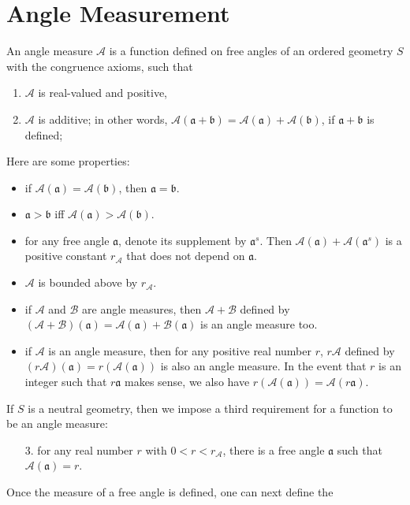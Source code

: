 \documentclass[12pt]{article}
\begin{document}
\section{Angle Measurement}
An angle measure $\mathcal{A}$ is a function defined on free angles
of an ordered geometry $S$ with the congruence axioms, such that
\begin{enumerate}
\item $\mathcal{A}$ is real-valued and positive,
\item $\mathcal{A}$ is additive; in other words,
$\mathcal{A}(\mathfrak{a}+\mathfrak{b})=
\mathcal{A}(\mathfrak{a})+\mathcal{A}(\mathfrak{b})$, if
$\mathfrak{a}+\mathfrak{b}$ is defined;
\end{enumerate}
Here are some properties:
\begin{itemize}
\item if $\mathcal{A}(\mathfrak{a})=\mathcal{A}(\mathfrak{b})$, then
$\mathfrak{a}=\mathfrak{b}$.
\item $\mathfrak{a}>\mathfrak{b}$ iff $\mathcal{A}(\mathfrak{a})>
\mathcal{A}(\mathfrak{b})$.
\item for any free angle $\mathfrak{a}$, denote its supplement by
$\mathfrak{a}^s$.  Then $\mathcal{A}(\mathfrak{a})+
\mathcal{A}(\mathfrak{a}^s)$ is a positive constant
$r_{\mathcal{A}}$ that does not depend on $\mathfrak{a}$.
\item $\mathcal{A}$ is bounded above by $r_{\mathcal{A}}$.
\item if $\mathcal{A}$ and $\mathcal{B}$ are angle measures, then
$\mathcal{A+B}$ defined by $(\mathcal{A+B})(\mathfrak{a})=
\mathcal{A}(\mathfrak{a})+\mathcal{B}(\mathfrak{a})$ is an angle
measure too.
\item if $\mathcal{A}$ is an angle measure, then for any positive
real number $r$, $r\mathcal{A}$ defined by
$(r\mathcal{A})(\mathfrak{a})=r(\mathcal{A}(\mathfrak{a}))$ is also
an angle measure.  In the event that $r$ is an integer such that
$r\mathfrak{a}$ makes sense, we also have
$r(\mathcal{A}(\mathfrak{a}))=\mathcal{A}(r\mathfrak{a})$.
\end{itemize}
If $S$ is a neutral geometry, then we impose a third requirement for
a function to be an angle measure:
\begin{enumerate}
\item[3.] for any real number $r$ with $0<r<r_{\mathcal{A}}$, there is a
free angle $\mathfrak{a}$ such that
$\mathcal{A}(\mathfrak{a})=r$.
\end{enumerate}
Once the measure of a free angle is defined, one can next define the
\end{document}
